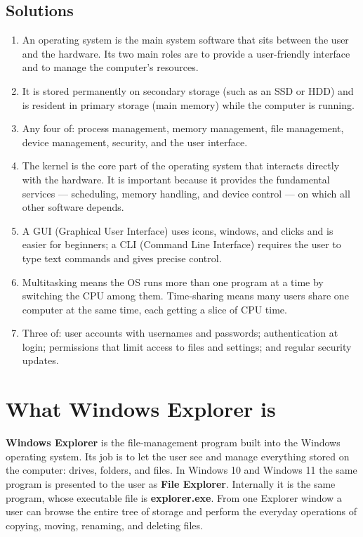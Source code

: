 \subsection*{Solutions}
\begingroup\small
\begin{enumerate}[label=\arabic*.]
  \item An operating system is the main system software that sits between the
    user and the hardware. Its two main roles are to provide a user-friendly
    interface and to manage the computer's resources.
  \item It is stored permanently on secondary storage (such as an SSD or HDD)
    and is resident in primary storage (main memory) while the computer is
    running.
  \item Any four of: process management, memory management, file management,
    device management, security, and the user interface.
  \item The kernel is the core part of the operating system that interacts
    directly with the hardware. It is important because it provides the
    fundamental services --- scheduling, memory handling, and device control
    --- on which all other software depends.
  \item A GUI (Graphical User Interface) uses icons, windows, and clicks and is
    easier for beginners; a CLI (Command Line Interface) requires the user to
    type text commands and gives precise control.
  \item Multitasking means the OS runs more than one program at a time by
    switching the CPU among them. Time-sharing means many users share one
    computer at the same time, each getting a slice of CPU time.
  \item Three of: user accounts with usernames and passwords; authentication at
    login; permissions that limit access to files and settings; and regular
    security updates.
\end{enumerate}
\endgroup

\section{What Windows Explorer is}
\textbf{Windows Explorer} is the file-management program built into the
Windows operating system. Its job is to let the user see and manage
everything stored on the computer: drives, folders, and files. In Windows 10
and Windows 11 the same program is presented to the user as \textbf{File
Explorer}. Internally it is the same program, whose executable file is
\textbf{explorer.exe}. From one Explorer window a user can browse the entire
tree of storage and perform the everyday operations of copying, moving,
renaming, and deleting files.

